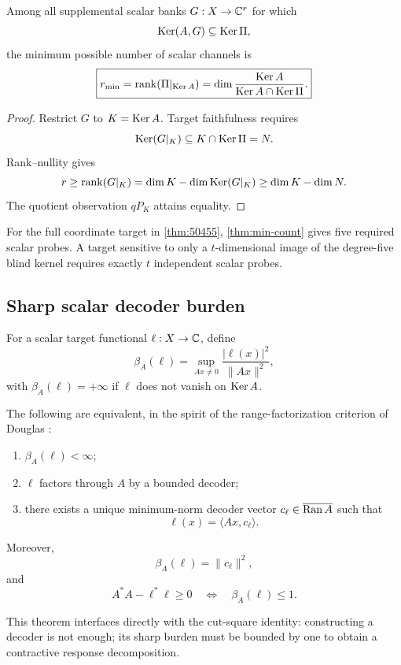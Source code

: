\begin{theorem}\label{thm:min-count}
Among all supplemental scalar banks $G:X\to\mathbb C^r$ for which
\[
 \operatorname{Ker}(A,G)\subseteq\operatorname{Ker}\Pi,
\]
the minimum possible number of scalar channels is
\[
 \boxed{r_{\min}=\operatorname{rank}(\Pi|_{\operatorname{Ker} A})
 =\dim\frac{\operatorname{Ker} A}{\operatorname{Ker} A\cap\operatorname{Ker}\Pi}.}
\]
\end{theorem}

\begin{proof}
Restrict $G$ to $K=\operatorname{Ker} A$. Target faithfulness requires
\[
 \operatorname{Ker}(G|_K)\subseteq K\cap\operatorname{Ker}\Pi=N.
\]
Rank--nullity gives
\[
 r\ge\operatorname{rank}(G|_K)
 =\dim K-\dim\operatorname{Ker}(G|_K)
 \ge\dim K-\dim N.
\]
The quotient observation $qP_K$ attains equality.
\end{proof}

\begin{corollary}
For the full coordinate target in \cref{thm:50455}, \cref{thm:min-count} gives five required scalar probes. A target sensitive to only a $t$-dimensional image of the degree-five blind kernel requires exactly $t$ independent scalar probes.
\end{corollary}

\subsection{Sharp scalar decoder burden}

For a scalar target functional $\ell:X\to\mathbb C$, define
\[
 \beta_A(\ell)=
 \sup_{Ax\ne0}\frac{|\ell(x)|^2}{\|Ax\|^2},
\]
with $\beta_A(\ell)=+\infty$ if $\ell$ does not vanish on $\operatorname{Ker} A$.

\begin{theorem}
The following are equivalent, in the spirit of the range-factorization criterion of Douglas \cite{douglas1966}:
\begin{enumerate}[label=(\roman*)]
\item $\beta_A(\ell)<\infty$;
\item $\ell$ factors through $A$ by a bounded decoder;
\item there exists a unique minimum-norm decoder vector $c_\ell\in\overline{\operatorname{Ran} A}$ such that
\[
 \ell(x)=\langle Ax,c_\ell\rangle.
\]
\end{enumerate}
Moreover,
\[
 \beta_A(\ell)=\|c_\ell\|^2,
\]
and
\[
 A^*A-\ell^*\ell\ge0
 \quad\Longleftrightarrow\quad
 \beta_A(\ell)\le1.
\]
\end{theorem}

This theorem interfaces directly with the cut-square identity: constructing a decoder is not enough; its sharp burden must be bounded by one to obtain a contractive response decomposition.

